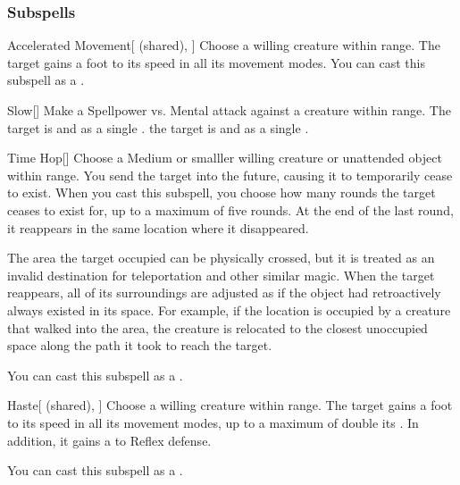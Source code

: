 \subsubsection{Subspells}


\begin{ability}[\nth{1}]{Accelerated Movement}[ (shared), ]
Choose a willing creature within \rngmed range.
The target gains a  foot  to its speed in all its movement modes.
You can cast this subspell as a .
\end{ability}
\vspace{0.25em}


\begin{ability}[\nth{1}]{Slow}[]
Make a Spellpower vs. Mental attack against a creature within \rngmed range.
\hit The target is  and  as a single .
\crit the target is  and  as a single .
\end{ability}
\vspace{0.25em}


\begin{ability}[\nth{2}]{Time Hop}[]
Choose a Medium or smalller willing creature or unattended object within \rngmed range.
You send the target into the future, causing it to temporarily cease to exist.
When you cast this subspell, you choose how many rounds the target ceases to exist for, up to a maximum of five rounds.
At the end of the last round, it reappears in the same location where it disappeared.

The area the target occupied can be physically crossed, but it is treated as an invalid destination for teleportation and other similar magic.
When the target reappears, all of its surroundings are adjusted as if the object had retroactively always existed in its space.
For example, if the location is occupied by a creature that walked into the area, the creature is relocated to the closest unoccupied space along the path it took to reach the target.

You can cast this subspell as a .
\end{ability}
\vspace{0.25em}


\begin{ability}[\nth{3}]{Haste}[ (shared), ]
Choose a willing creature within \rngmed range.
The target gains a  foot  to its speed in all its movement modes, up to a maximum of double its .
In addition, it gains a   to Reflex defense.

You can cast this subspell as a .
\end{ability}
\vspace{0.25em}


